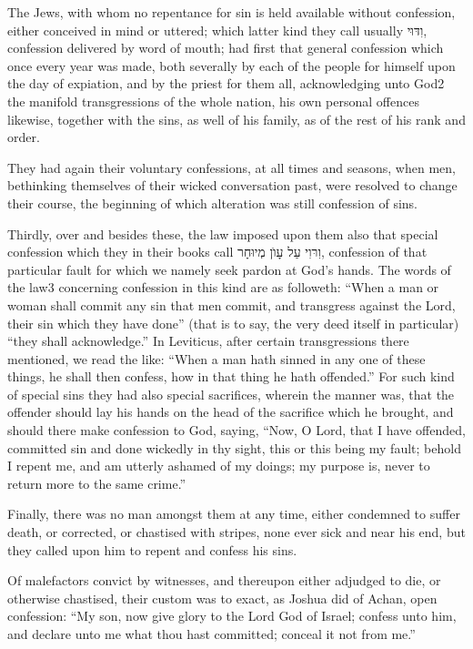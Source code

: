 The Jews, with whom no repentance for sin is held available without confession, either conceived in mind or uttered; which latter kind they call usually וִדּוּי, confession delivered by word of mouth; had first that general confession which once every year was made, both severally by each of the people for himself upon the day of expiation, and by the priest for them all, acknowledging unto God2 the manifold transgressions of the whole nation, his own personal offences likewise, together with the sins, as well of his family, as of the rest of his rank and order.

They had again their voluntary confessions, at all times and seasons, when men, bethinking themselves of their wicked conversation past, were resolved to change their course, the beginning of which alteration was still confession of sins.

Thirdly, over and besides these, the law imposed upon them also that special confession which they in their books call וִרּוִי עַל עָוׁן מְיוּחָר, confession of that particular fault for which we namely seek pardon at God’s hands. The words of the law3 concerning confession in this kind are as followeth: “When a man or woman shall commit any sin that men commit, and transgress against the Lord, their sin which they have done” (that is to say, the very deed itself in particular) “they shall acknowledge.” In Leviticus, after certain transgressions there mentioned, we read the like: “When a man hath sinned in any one of these things, he shall then confess, how in that thing he hath offended.” For such kind of special sins they had also special sacrifices, wherein the manner was, that the offender should lay his hands on the head of the sacrifice which he brought, and should there make confession to God, saying, “Now, O Lord, that I have offended, committed sin and done wickedly in thy sight, this or this being my fault; behold I repent me, and am utterly ashamed of my doings; my purpose is, never to return more to the same crime.”

Finally, there was no man amongst them at any time, either condemned to suffer death, or corrected, or chastised with stripes, none ever sick and near his end, but they called upon him to repent and confess his sins.

Of malefactors convict by witnesses, and thereupon either adjudged to die, or otherwise chastised, their custom was to exact, as Joshua did of Achan, open confession: “My son, now give glory to the Lord God of Israel; confess unto him, and declare unto me what thou hast committed; conceal it not from me.”

